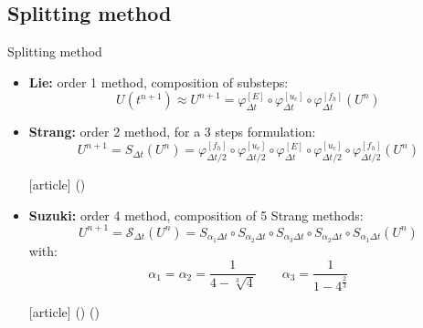 \documentclass{beamer}
\newcommand{\mbold}[1]{{\textbf{\color{PLB}#1}}}
\newcommand{\customcite}[1]{\citeauthor{#1} (\citeyear{#1})}
\begin{document}
\subsection{Splitting method}
\begin{frame}{Splitting method}
  \begin{itemize}
    \item \mbold{Lie:} order 1 method, composition of substeps: $$U(t^{n+1})\approx U^{n+1} = \varphi^{[E]}_{\Delta t} \circ \varphi^{[u_c]}_{\Delta t} \circ \varphi^{[f_h]}_{\Delta t}(U^n)$$
    \item \mbold{Strang:} order 2 method, for a 3 steps formulation: $$U^{n+1} = S_{\Delta t}(U^n) = \varphi^{[f_h]}_{\Delta t/2} \circ \varphi^{[u_c]}_{\Delta t/2} \circ \varphi^{[E]}_{\Delta t} \circ \varphi^{[u_c]}_{\Delta t/2} \circ \varphi^{[f_h]}_{\Delta t/2} (U^n) $$ \begin{thebibliography}{9}
    [article]
     \customcite{Strang:1968}
  \end{thebibliography}
    \item \mbold{Suzuki:} order 4 method, composition of 5 Strang methods: $$
      U^{n+1} = \mathcal{S}_{\Delta t}(U^n) = S_{\alpha_1\Delta t} \circ S_{\alpha_2\Delta t} \circ S_{\alpha_3\Delta t} \circ S_{\alpha_2\Delta t} \circ S_{\alpha_1\Delta t} (U^n)
    $$with: $$ \alpha_1 = \alpha_2 = \frac{1}{4 - \sqrt[3]{4}} \qquad \alpha_3 = \frac{1}{1- 4^{\frac{2}{3}}}$$ \begin{thebibliography}{9}
    [article]
     \customcite{Suzuki:1990}
     \customcite{Casas:2020}
  \end{thebibliography}
  \end{itemize}
\end{frame}
\end{document}
